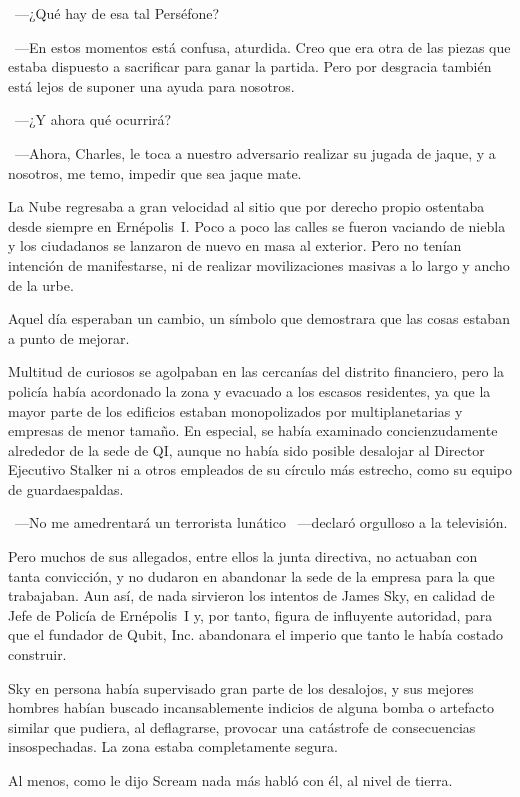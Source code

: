 ~---¿Qué hay de esa tal Perséfone?

~---En estos momentos está confusa, aturdida. Creo que era otra de las piezas que estaba dispuesto a sacrificar para ganar la partida. Pero por desgracia también está lejos de suponer una ayuda para nosotros.

~---¿Y ahora qué ocurrirá?

~---Ahora, Charles, le toca a nuestro adversario realizar su jugada de jaque, y a nosotros, me temo, impedir que sea jaque mate.

\parbreak
La Nube regresaba a gran velocidad al sitio que por derecho propio ostentaba desde siempre en Ernépolis~I. Poco a poco las calles se fueron vaciando de niebla y los ciudadanos se lanzaron de nuevo en masa al exterior. Pero no tenían intención de manifestarse, ni de realizar movilizaciones masivas a lo largo y ancho de la urbe.

Aquel día esperaban un cambio, un símbolo que demostrara que las cosas estaban a punto de mejorar.

Multitud de curiosos se agolpaban en las cercanías del distrito financiero, pero la policía había acordonado la zona y evacuado a los escasos residentes, ya que la mayor parte de los edificios estaban monopolizados por multiplanetarias y empresas de menor tamaño. En especial, se había examinado concienzudamente alrededor de la sede de QI, aunque no había sido posible desalojar al Director Ejecutivo Stalker ni a otros empleados de su círculo más estrecho, como su equipo de guardaespaldas.

~---No me amedrentará un terrorista lunático ~---declaró orgulloso a la televisión.

Pero muchos de sus allegados, entre ellos la junta directiva, no actuaban con tanta convicción, y no dudaron en abandonar la sede de la empresa para la que trabajaban. Aun así, de nada sirvieron los intentos de James Sky, en calidad de Jefe de Policía de Ernépolis~I y, por tanto, figura de influyente autoridad, para que el fundador de Qubit, Inc. abandonara el imperio que tanto le había costado construir.

Sky en persona había supervisado gran parte de los desalojos, y sus mejores hombres habían buscado incansablemente indicios de alguna bomba o artefacto similar que pudiera, al deflagrarse, provocar una catástrofe de consecuencias insospechadas. La zona estaba completamente segura.

Al menos, como le dijo Scream nada más habló con él, al nivel de tierra.

